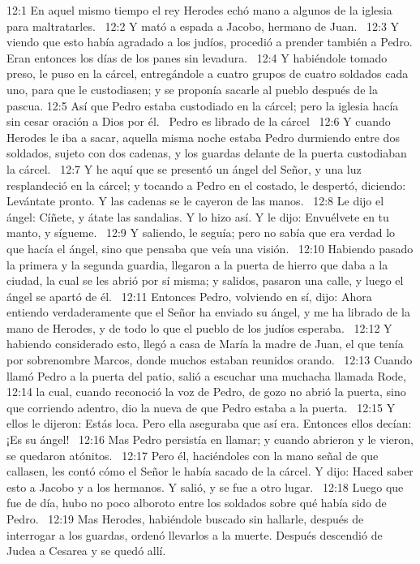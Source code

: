 12:1 En aquel mismo tiempo el rey Herodes echó mano a algunos de la iglesia para maltratarles.  
12:2 Y mató a espada a Jacobo, hermano de Juan.  
12:3 Y viendo que esto había agradado a los judíos, procedió a prender también a Pedro. Eran entonces los días de los panes sin levadura.  
12:4 Y habiéndole tomado preso, le puso en la cárcel, entregándole a cuatro grupos de cuatro soldados cada uno, para que le custodiasen; y se proponía sacarle al pueblo después de la pascua. 
12:5 Así que Pedro estaba custodiado en la cárcel; pero la iglesia hacía sin cesar oración a Dios por él.  
Pedro es librado de la cárcel  
12:6 Y cuando Herodes le iba a sacar, aquella misma noche estaba Pedro durmiendo entre dos soldados, sujeto con dos cadenas, y los guardas delante de la puerta custodiaban la cárcel.  
12:7 Y he aquí que se presentó un ángel del Señor, y una luz resplandeció en la cárcel; y tocando a Pedro en el costado, le despertó, diciendo: Levántate pronto. Y las cadenas se le cayeron de las manos.  
12:8 Le dijo el ángel: Cíñete, y átate las sandalias. Y lo hizo así. Y le dijo: Envuélvete en tu manto, y sígueme.  
12:9 Y saliendo, le seguía; pero no sabía que era verdad lo que hacía el ángel, sino que pensaba que veía una visión.  
12:10 Habiendo pasado la primera y la segunda guardia, llegaron a la puerta de hierro que daba a la ciudad, la cual se les abrió por sí misma; y salidos, pasaron una calle, y luego el ángel se apartó de él.  
12:11 Entonces Pedro, volviendo en sí, dijo: Ahora entiendo verdaderamente que el Señor ha enviado su ángel, y me ha librado de la mano de Herodes, y de todo lo que el pueblo de los judíos esperaba.  
12:12 Y habiendo considerado esto, llegó a casa de María la madre de Juan, el que tenía por sobrenombre Marcos, donde muchos estaban reunidos orando.  
12:13 Cuando llamó Pedro a la puerta del patio, salió a escuchar una muchacha llamada Rode,  
12:14 la cual, cuando reconoció la voz de Pedro, de gozo no abrió la puerta, sino que corriendo adentro, dio la nueva de que Pedro estaba a la puerta.  
12:15 Y ellos le dijeron: Estás loca. Pero ella aseguraba que así era. Entonces ellos decían: ¡Es su ángel!  
12:16 Mas Pedro persistía en llamar; y cuando abrieron y le vieron, se quedaron atónitos.  
12:17 Pero él, haciéndoles con la mano señal de que callasen, les contó cómo el Señor le había sacado de la cárcel. Y dijo: Haced saber esto a Jacobo y a los hermanos. Y salió, y se fue a otro lugar.  
12:18 Luego que fue de día, hubo no poco alboroto entre los soldados sobre qué había sido de Pedro.  
12:19 Mas Herodes, habiéndole buscado sin hallarle, después de interrogar a los guardas, ordenó llevarlos a la muerte. Después descendió de Judea a Cesarea y se quedó allí.  
